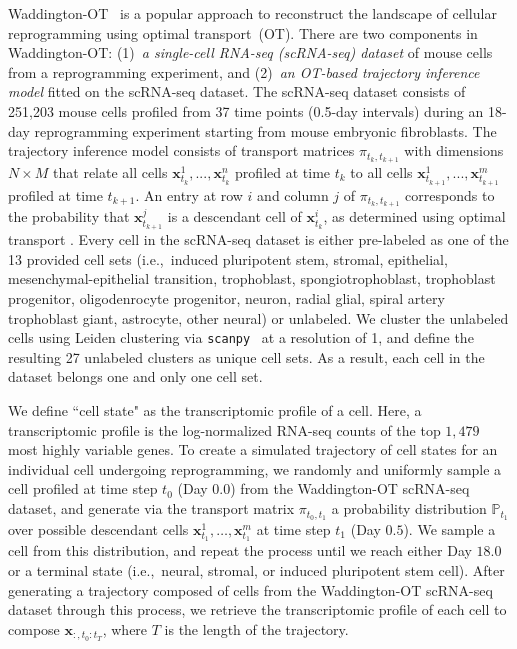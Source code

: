 %
Waddington-OT~\cite{schiebinger2019-ie} is a popular approach to reconstruct the landscape of cellular reprogramming using optimal transport~(OT). There are two components in Waddington-OT: (1)~\textit{a single-cell RNA-seq (scRNA-seq) dataset} of mouse cells from a reprogramming experiment, and (2)~\textit{an OT-based trajectory inference model} fitted on the scRNA-seq dataset. The scRNA-seq dataset consists of 251,203 mouse cells profiled from 37 time points (0.5-day intervals) during an 18-day reprogramming experiment starting from mouse embryonic fibroblasts. The trajectory inference model consists of transport matrices $\pi_{t_k,t_{k+1}}$ with dimensions $N \times M$ that relate all cells $\mathbf{x}^1_{t_k}, ..., \mathbf{x}^n_{t_k}$ profiled at time $t_k$ to all cells $\mathbf{x}^1_{t_{k+1}}, ..., \mathbf{x}^m_{t_{k+1}}$ profiled at time $t_{k+1}$. An entry at row $i$ and column $j$ of $\pi_{t_k,t_{k+1}}$ corresponds to the probability that $\mathbf{x}^j_{t_{k+1}}$ is a descendant cell of $\mathbf{x}^i_{t_k}$, as determined using optimal transport \cite{chizat2017scalingalgorithm}. Every cell in the scRNA-seq dataset is either pre-labeled as one of the 13 provided cell sets (i.e.,~induced pluripotent stem, stromal, epithelial, mesenchymal-epithelial transition, trophoblast, spongiotrophoblast, trophoblast progenitor, oligodenrocyte progenitor, neuron, radial glial, spiral artery trophoblast giant, astrocyte, other neural) or unlabeled. We cluster the unlabeled cells using Leiden clustering via \texttt{scanpy}~\cite{wolf2018-tb} at a resolution of 1, and define the resulting 27 unlabeled clusters as unique cell sets. As a result, each cell in the dataset belongs one and only one cell set. 


%
We define ``cell state" as the transcriptomic profile of a cell. Here, a transcriptomic profile is the log-normalized RNA-seq counts of the top $1,479$ most highly variable genes. To create a simulated trajectory of cell states for an individual cell undergoing reprogramming, we randomly and uniformly sample a cell profiled at time step $t_0$ (Day $0.0$) from the Waddington-OT scRNA-seq dataset, and generate via the transport matrix $\pi_{t_0,t_1}$ a probability distribution $\mathbb{P}_{t_1}$ over possible descendant cells $\mathbf{x}^1_{t_1}, \dots, \mathbf{x}^m_{t_1}$ at time step $t_1$ (Day $0.5$). We sample a cell from this distribution, and repeat the process until we reach either Day $18.0$ or a terminal state (i.e.,~neural, stromal, or induced pluripotent stem cell). After generating a trajectory composed of cells from the Waddington-OT scRNA-seq dataset through this process, we retrieve the transcriptomic profile of each cell to compose $\mathbf{x}_{:,t_0:t_T}$, where $T$ is the length of the trajectory.


